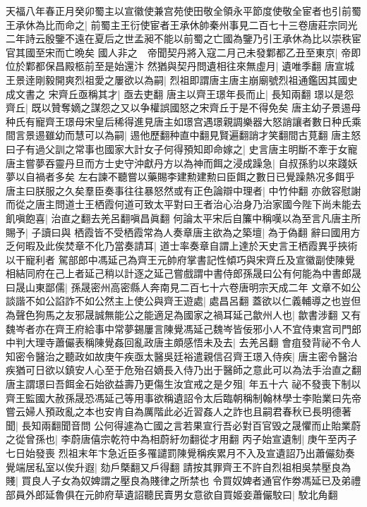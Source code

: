 天福八年春正月癸卯蜀主以宣徽使兼宫苑使田敬全領永平節度使敬全宦者也引前蜀王承休為比而命之|{
	前蜀主王衍使宦者王承休帥秦州事見二百七十三卷唐莊宗同光二年詩云殷鑒不遠在夏后之世孟昶不能以前蜀之亡國為鑒乃引王承休為比以崇秩宦官其國至宋而亡晩矣}
國人非之　帝聞契丹將入寇二月己未發鄴都乙丑至東京|{
	帝即位於鄴都保昌殿柩前至是始還汴}
然猶與契丹問遺相往來無虛月|{
	遺唯季翻}
唐宣城王景逹剛毅開爽烈祖愛之屢欲以為嗣|{
	烈祖即謂唐主唐主崩廟號烈祖通鑑因其國史成文書之}
宋齊丘亟稱其才|{
	亟去吏翻}
唐主以齊王璟年長而止|{
	長知兩翻}
璟以是怨齊丘|{
	既以贊奪嫡之謀怨之又以争權誤國怒之宋齊丘于是不得免矣}
唐主幼子景逷母种氏有寵齊王璟母宋皇后稀得進見唐主如璟宫遇璟親調樂器大怒誚讓者數日种氏乘間言景逷雖幼而慧可以為嗣|{
	逷他歷翻种直中翻見賢遍翻誚才笑翻間古莧翻}
唐主怒曰子有過父訓之常事也國家大計女子何得預知即命嫁之|{
	史言唐主明斷不牽于女寵}
唐主嘗夢吞靈丹旦而方士史守沖獻丹方以為神而餌之浸成躁急|{
	自叔孫豹以來踐妖夢以自禍者多矣}
左右諫不聽嘗以藥賜李建勲建勲曰臣餌之數日已覺躁熱况多餌乎唐主曰朕服之久矣羣臣奏事往往暴怒然或有正色論辯中理者|{
	中竹仲翻}
亦斂容慰謝而從之唐主問道士王栖霞何道可致太平對曰王者治心治身乃治家國今陛下尚未能去飢嗔飽喜|{
	治直之翻去羌呂翻嗔昌眞翻}
何論太平宋后自簾中稱嘆以為至言凡唐主所賜予|{
	子讀曰與}
栖霞皆不受栖霞常為人奏章唐主欲為之築壇|{
	為于偽翻}
辭曰國用方乏何暇及此俟焚章不化乃當奏請耳|{
	道士率奏章自謂上達於天史言王栖霞異乎挾術以干寵利者}
駕部郎中馮延己為齊王元帥府掌書記性傾巧與宋齊丘及宣徽副使陳覺相結同府在己上者延己稍以計逐之延己嘗戲謂中書侍郎孫晟曰公有何能為中書郎晟曰晟山東鄙儒|{
	孫晟密州高密縣人奔南見二百七十六卷唐明宗天成二年}
文章不如公談諧不如公諂詐不如公然主上使公與齊王遊處|{
	處昌呂翻}
蓋欲以仁義輔導之也豈但為聲色狗馬之友邪晟誠無能公之能適足為國家之禍耳延己歙州人也|{
	歙書涉翻}
又有魏岑者亦在齊王府給事中常夢錫屢言陳覺馮延己魏岑皆佞邪小人不宜侍東宫司門郎中判大理寺蕭儼表稱陳覺姦回亂政唐主頗感悟未及去|{
	去羌呂翻}
會疽發背祕不令人知密令醫治之聽政如故庚午疾亟太醫吳廷裕遣親信召齊王璟入侍疾|{
	唐主密令醫治疾猶可日欲以鎮安人心至于危殆召嫡長入侍乃出于醫師之意此可以為法手治直之翻}
唐主謂璟曰吾餌金石始欲益壽乃更傷生汝宜戒之是夕殂|{
	年五十六}
祕不發喪下制以齊王監國大赦孫晟恐馮延己等用事欲稱遺詔令太后臨朝稱制翰林學士李貽業曰先帝嘗云婦人預政亂之本也安肯自為厲階此必近習姦人之詐也且嗣君春秋已長明德著聞|{
	長知兩翻聞音問}
公何得遽為亡國之言若果宣行吾必對百官毁之晟懼而止貽業蔚之從曾孫也|{
	李蔚唐僖宗乾符中為相蔚紆勿翻從才用翻}
丙子始宣遺制|{
	庚午至丙子七日始發喪}
烈祖末年卞急近臣多罹譴罰陳覺稱疾累月不入及宣遺詔乃出蕭儼劾奏覺端居私室以俟升遐|{
	劾戶槩翻又戶得翻}
請按其罪齊王不許自烈祖相吳禁壓良為賤|{
	買良人子女為奴婢謂之壓良為賤律之所禁也}
令買奴婢者通官作劵馮延已及弟禮部員外郎延魯俱在元帥府草遺詔聽民賣男女意欲自買姬妾蕭儼駮曰|{
	駮北角翻}
